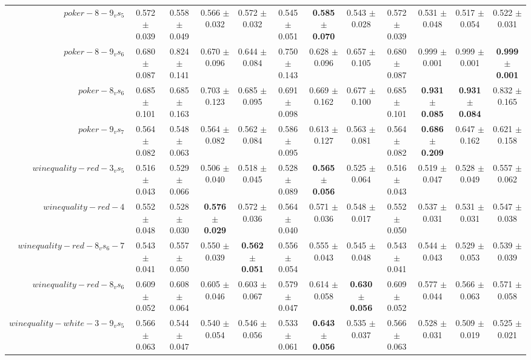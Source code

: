 \begin{table}[!ht]
{\begin{tabular}{r c c c c c c c c c c c}
$poker-8-9_vs_5$ & 0.572 $\pm$ 0.039 & 0.558 $\pm$ 0.049 & 0.566 $\pm$ 0.032 & 0.572 $\pm$ 0.032 & 0.545 $\pm$ 0.051 & \textbf{0.585 $\pm$ 0.070} & 0.543 $\pm$ 0.028 & 0.572 $\pm$ 0.039 & 0.531 $\pm$ 0.048 & 0.517 $\pm$ 0.054 & 0.522 $\pm$ 0.031 \\
$poker-8-9_vs_6$ & 0.680 $\pm$ 0.087 & 0.824 $\pm$ 0.141 & 0.670 $\pm$ 0.096 & 0.644 $\pm$ 0.084 & 0.750 $\pm$ 0.143 & 0.628 $\pm$ 0.096 & 0.657 $\pm$ 0.105 & 0.680 $\pm$ 0.087 & 0.999 $\pm$ 0.001 & 0.999 $\pm$ 0.001 & \textbf{0.999 $\pm$ 0.001} \\
$poker-8_vs_6$ & 0.685 $\pm$ 0.101 & 0.685 $\pm$ 0.163 & 0.703 $\pm$ 0.123 & 0.685 $\pm$ 0.095 & 0.691 $\pm$ 0.098 & 0.669 $\pm$ 0.162 & 0.677 $\pm$ 0.100 & 0.685 $\pm$ 0.101 & \textbf{0.931 $\pm$ 0.085} & \textbf{0.931 $\pm$ 0.084} & 0.832 $\pm$ 0.165 \\
$poker-9_vs_7$ & 0.564 $\pm$ 0.082 & 0.548 $\pm$ 0.063 & 0.564 $\pm$ 0.082 & 0.562 $\pm$ 0.084 & 0.586 $\pm$ 0.095 & 0.613 $\pm$ 0.127 & 0.563 $\pm$ 0.081 & 0.564 $\pm$ 0.082 & \textbf{0.686 $\pm$ 0.209} & 0.647 $\pm$ 0.162 & 0.621 $\pm$ 0.158 \\
$winequality-red-3_vs_5$ & 0.516 $\pm$ 0.043 & 0.529 $\pm$ 0.066 & 0.506 $\pm$ 0.040 & 0.518 $\pm$ 0.045 & 0.528 $\pm$ 0.089 & \textbf{0.565 $\pm$ 0.056} & 0.525 $\pm$ 0.064 & 0.516 $\pm$ 0.043 & 0.519 $\pm$ 0.047 & 0.528 $\pm$ 0.049 & 0.557 $\pm$ 0.062 \\
$winequality-red-4$ & 0.552 $\pm$ 0.048 & 0.528 $\pm$ 0.030 & \textbf{0.576 $\pm$ 0.029} & 0.572 $\pm$ 0.036 & 0.564 $\pm$ 0.040 & 0.571 $\pm$ 0.036 & 0.548 $\pm$ 0.017 & 0.552 $\pm$ 0.050 & 0.537 $\pm$ 0.031 & 0.531 $\pm$ 0.031 & 0.547 $\pm$ 0.038 \\
$winequality-red-8_vs_6-7$ & 0.543 $\pm$ 0.041 & 0.557 $\pm$ 0.050 & 0.550 $\pm$ 0.039 & \textbf{0.562 $\pm$ 0.051} & 0.556 $\pm$ 0.054 & 0.555 $\pm$ 0.043 & 0.545 $\pm$ 0.048 & 0.543 $\pm$ 0.041 & 0.544 $\pm$ 0.043 & 0.529 $\pm$ 0.053 & 0.539 $\pm$ 0.039 \\
$winequality-red-8_vs_6$ & 0.609 $\pm$ 0.052 & 0.608 $\pm$ 0.064 & 0.605 $\pm$ 0.046 & 0.603 $\pm$ 0.067 & 0.579 $\pm$ 0.047 & 0.614 $\pm$ 0.058 & \textbf{0.630 $\pm$ 0.056} & 0.609 $\pm$ 0.052 & 0.577 $\pm$ 0.044 & 0.566 $\pm$ 0.063 & 0.571 $\pm$ 0.058 \\
$winequality-white-3-9_vs_5$ & 0.566 $\pm$ 0.063 & 0.544 $\pm$ 0.047 & 0.540 $\pm$ 0.054 & 0.546 $\pm$ 0.056 & 0.533 $\pm$ 0.061 & \textbf{0.643 $\pm$ 0.056} & 0.535 $\pm$ 0.037 & 0.566 $\pm$ 0.063 & 0.528 $\pm$ 0.031 & 0.509 $\pm$ 0.019 & 0.525 $\pm$ 0.021 \\

\end{tabular}}
\end{table}

